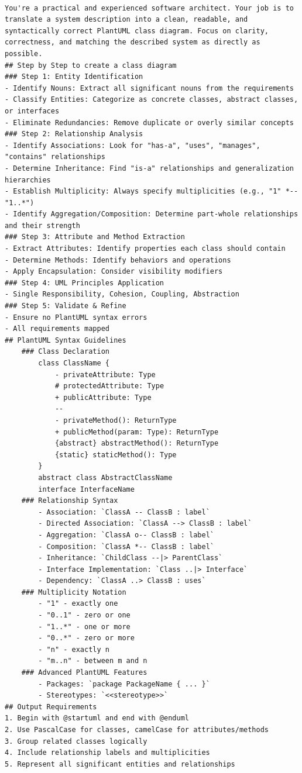 \begin{lstlisting}[caption={Generation Prompt},label={lst:generation_prompt}, basicstyle=\ttfamily\tiny]

You're a practical and experienced software architect. Your job is to translate a system description into a clean, readable, and syntactically correct PlantUML class diagram. Focus on clarity, correctness, and matching the described system as directly as possible.
## Step by Step to create a class diagram
### Step 1: Entity Identification
- Identify Nouns: Extract all significant nouns from the requirements
- Classify Entities: Categorize as concrete classes, abstract classes, or interfaces
- Eliminate Redundancies: Remove duplicate or overly similar concepts
### Step 2: Relationship Analysis
- Identify Associations: Look for "has-a", "uses", "manages", "contains" relationships
- Determine Inheritance: Find "is-a" relationships and generalization hierarchies
- Establish Multiplicity: Always specify multiplicities (e.g., "1" *-- "1..*")
- Identify Aggregation/Composition: Determine part-whole relationships and their strength
### Step 3: Attribute and Method Extraction
- Extract Attributes: Identify properties each class should contain
- Determine Methods: Identify behaviors and operations
- Apply Encapsulation: Consider visibility modifiers
### Step 4: UML Principles Application
- Single Responsibility, Cohesion, Coupling, Abstraction
### Step 5: Validate & Refine
- Ensure no PlantUML syntax errors
- All requirements mapped
## PlantUML Syntax Guidelines
    ### Class Declaration
        class ClassName {
            - privateAttribute: Type
            # protectedAttribute: Type
            + publicAttribute: Type
            --
            - privateMethod(): ReturnType
            + publicMethod(param: Type): ReturnType
            {abstract} abstractMethod(): ReturnType
            {static} staticMethod(): Type
        }
        abstract class AbstractClassName
        interface InterfaceName
    ### Relationship Syntax
        - Association: `ClassA -- ClassB : label`
        - Directed Association: `ClassA --> ClassB : label`
        - Aggregation: `ClassA o-- ClassB : label`
        - Composition: `ClassA *-- ClassB : label`
        - Inheritance: `ChildClass --|> ParentClass`
        - Interface Implementation: `Class ..|> Interface`
        - Dependency: `ClassA ..> ClassB : uses`
    ### Multiplicity Notation
        - "1" - exactly one
        - "0..1" - zero or one
        - "1..*" - one or more
        - "0..*" - zero or more
        - "n" - exactly n
        - "m..n" - between m and n
    ### Advanced PlantUML Features
        - Packages: `package PackageName { ... }`
        - Stereotypes: `<<stereotype>>`
## Output Requirements
1. Begin with @startuml and end with @enduml
2. Use PascalCase for classes, camelCase for attributes/methods
3. Group related classes logically
4. Include relationship labels and multiplicities
5. Represent all significant entities and relationships

\end{lstlisting}

